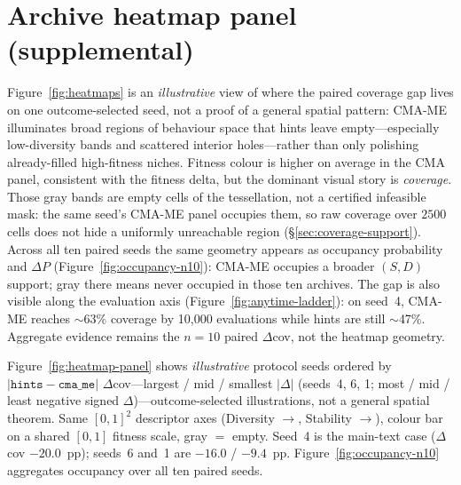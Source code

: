 \begin{table}[!htbp]
  \centering
  \caption{CVT sensitivity on the \emph{bundled} stub/hints/filter stack only (paired $n{=}10$; descriptive). Matched H1 is not repeated on CVT.}
  \label{tab:cvt}
  \small
\end{table}

\section{Archive heatmap panel (supplemental)}
\label{sec:heatmap-panel}

Figure~\ref{fig:heatmaps} is an \emph{illustrative} view of where the paired coverage gap lives on one outcome-selected seed, not a proof of a general spatial pattern: CMA-ME illuminates broad regions of behaviour space that hints leave empty---especially low-diversity bands and scattered interior holes---rather than only polishing already-filled high-fitness niches. Fitness colour is higher on average in the CMA panel, consistent with the fitness delta, but the dominant visual story is \emph{coverage}. Those gray bands are empty cells of the tessellation, not a certified infeasible mask: the same seed's CMA-ME panel occupies them, so raw coverage over $2500$ cells does not hide a uniformly unreachable region (\S\ref{sec:coverage-support}). Across all ten paired seeds the same geometry appears as occupancy probability and $\Delta P$ (Figure~\ref{fig:occupancy-n10}): CMA-ME occupies a broader $(S,D)$ support; gray there means never occupied in those ten archives. The gap is also visible along the evaluation axis (Figure~\ref{fig:anytime-ladder}): on seed~4, CMA-ME reaches $\sim$63\% coverage by 10{,}000 evaluations while hints are still $\sim$47\%. Aggregate evidence remains the $n{=}10$ paired $\Delta$cov, not the heatmap geometry.

Figure~\ref{fig:heatmap-panel} shows \emph{illustrative} protocol seeds ordered by $|\texttt{hints}-\texttt{cma\_me}|$ $\Delta$cov---largest / mid / smallest $|\Delta|$ (seeds~4, 6, 1; most / mid / least negative signed $\Delta$)---outcome-selected illustrations, not a general spatial theorem. Same $[0,1]^2$ descriptor axes (Diversity $\rightarrow$, Stability $\rightarrow$), colour bar on a shared $[0,1]$ fitness scale, gray $=$ empty. Seed~4 is the main-text case ($\Delta$cov $-20.0$~pp); seeds~6 and~1 are $-16.0$ / $-9.4$~pp. Figure~\ref{fig:occupancy-n10} aggregates occupancy over all ten paired seeds.

